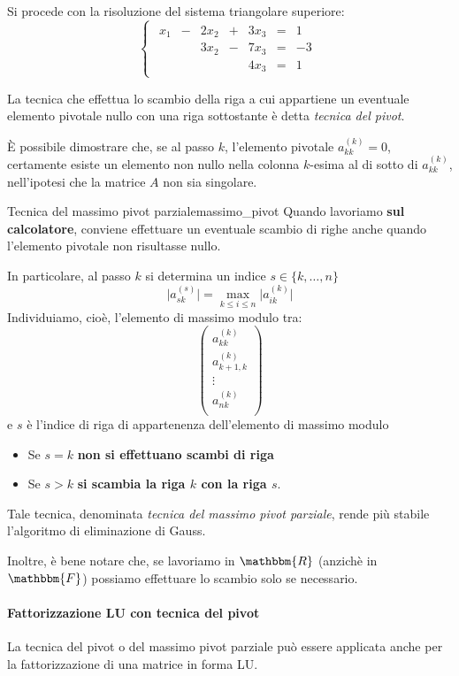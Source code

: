 \documentclass[12pt]{report}
\newcounter{exercise}
\newcommand{\nmu}{}
\begin{document}
\begin{exercise}{}{}
Si procede con la risoluzione del sistema triangolare superiore:
\[
\begin{cases}
\begin{array}{rcrcrcr}
  x_1 & - & 2x_2 & +  & 3x_3 & = & 1 \\
  &  & 3x_2 & - & 7x_3 &  = &  -3 \\
  &  &  &   & 4x_3     & = &  1
\end{array}
\end{cases}
\]
\end{exercise}
La tecnica che effettua lo scambio della riga a cui appartiene un eventuale elemento pivotale nullo con una riga sottostante è detta \textit{tecnica del pivot}.

È possibile dimostrare che, se al passo $k$, l'elemento pivotale $a^{(k)}_{kk} = 0$, certamente esiste un elemento non nullo nella colonna $k$-esima al di sotto di $a^{(k)}_{kk}$, nell'ipotesi che la matrice $A$ non sia singolare.
\begin{note}{\nmu Tecnica del massimo pivot parziale}{massimo_pivot}
Quando lavoriamo \textbf{sul calcolatore}, conviene effettuare un eventuale scambio di righe anche quando l'elemento pivotale non risultasse nullo.

In particolare, al passo $k$ si determina un indice $s \in \{k, \dots, n\}$
\[
\lvert a^{(s)}_{sk} \rvert = \max_{k \leq i \leq n}\lvert a^{(k)}_{ik} \rvert
\]
Individuiamo, cioè, l'elemento di massimo modulo tra:
\[
\begin{pmatrix}
	a^{(k)}_{kk} \\
	a^{(k)}_{k+1, k} \\
	\vdots \\
	a^{(k)}_{nk} \\
\end{pmatrix}
\]
e $s$ è l'indice di riga di appartenenza dell'elemento di massimo modulo
\begin{itemize}
	\item Se $s = k$ \textbf{non si effettuano scambi di riga}
	\item Se $s > k$ \textbf{si scambia la riga $k$ con la riga $s$}.
\end{itemize}
Tale tecnica, denominata \textit{tecnica del massimo pivot parziale}, rende più stabile l'algoritmo di eliminazione di Gauss.

Inoltre, è bene notare che, se lavoriamo in $\mathbbm{R}$ (anzichè in $\mathbbm{F}$) possiamo effettuare lo scambio solo se necessario.
\end{note}
\paragraph{Fattorizzazione LU con tecnica del pivot} La tecnica del pivot o del massimo pivot parziale può essere applicata anche per la fattorizzazione di una matrice in forma LU.
\end{document}
